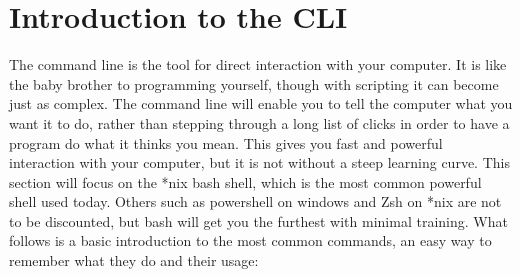 \documentclass[a4paper,11pt]{report}
\begin{document}
	\section{Introduction to the CLI}
		The command line is the tool for direct interaction with your computer. 
		It is like the baby brother to programming yourself, though with scripting it can become just as complex. 
		The command line will enable you to tell the computer what you want it to do, rather than stepping through a long list of clicks in order to have a program do what it thinks you mean. 
		This gives you fast and powerful interaction with your computer, but it is not without a steep learning curve. 
		This section will focus on the \**nix bash shell, which is the most common powerful shell used today. 
		Others such as powershell on windows and Zsh on \**nix are not to be discounted, but bash will get you the furthest with minimal training.\cite{CLICrashCourse}
		What follows is a basic introduction to the most common commands, an easy way to remember what they do and their usage:
\end{document}
